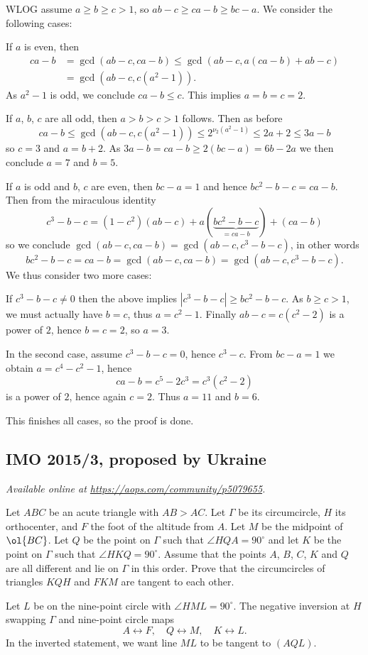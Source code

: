 \documentclass[11pt]{scrartcl}
\begin{document}
WLOG assume $a \ge b \ge c > 1$, so $ab-c \ge ca-b \ge bc-a$.
We consider the following cases:
\begin{itemize}
  \ii If $a$ is even, then
  \begin{align*}
    ca-b &= \gcd (ab-c, ca-b) \le \gcd (ab-c, a(ca-b)+ab-c) \\
    &= \gcd\left( ab-c, c(a^2-1) \right).
  \end{align*}
  As $a^2-1$ is odd, we conclude $ca-b \le c$.
  This implies $a=b=c=2$.

  \ii If $a$, $b$, $c$ are all odd, then $a > b > c > 1$ follows.
  Then as before
  \[  ca-b \le \gcd (ab-c, c(a^2-1))
    \le 2^{\nu_2(a^2-1)} \le 2a+2 \le 3a-b \]
  so $c = 3$ and $a = b+2$.
  As $3a-b = ca-b \ge 2(bc-a) = 6b-2a$ we then conclude $a=7$ and $b=5$.

  \ii If $a$ is odd and $b$, $c$ are even, then $bc-a=1$
  and hence $bc^2 - b - c = ca - b$.
  Then from the miraculous identity
  \[ c^3-b-c = (1-c^2)(ab-c) + a(\underbrace{bc^2-b-c}_{=ca-b}) + (ca-b) \]
  so we conclude $\gcd(ab-c, ca-b) = \gcd(ab-c, c^3-b-c)$, in other words
  \[ bc^2-b-c = ca-b = \gcd(ab-c, ca-b) = \gcd(ab-c, c^3-b-c). \]
  We thus consider two more cases:
  \begin{itemize}
    \ii If $c^3-b-c \neq 0$ then
    the above implies $|c^3-b-c| \ge bc^2-b-c$.
    As $b \ge c > 1$, we must actually have $b = c$,
    thus $a = c^2-1$.
    Finally $ab-c = c(c^2-2)$ is a power of $2$, hence $b=c=2$, so $a=3$.

    \ii In the second case, assume $c^3-b-c = 0$, hence $c^3-c$.
    From $bc-a=1$ we obtain $a=c^4-c^2-1$,
    hence
    \[ ca-b = c^5-2c^3 = c^3(c^2-2) \]
    is a power of $2$, hence again $c = 2$.
    Thus $a=11$ and $b=6$.
  \end{itemize}
\end{itemize}
This finishes all cases, so the proof is done.
\pagebreak

\subsection{IMO 2015/3, proposed by Ukraine}
\textsl{Available online at \url{https://aops.com/community/p5079655}.}
\begin{mdframed}[style=mdpurplebox,frametitle={Problem statement}]
Let $ABC$ be an acute triangle with $AB > AC$.
Let $\Gamma$ be its circumcircle, $H$ its orthocenter,
and $F$ the foot of the altitude from $A$.
Let $M$ be the midpoint of $\ol{BC}$.
Let $Q$ be the point on $\Gamma$ such that $\angle HQA = 90^{\circ}$
and let $K$ be the point on $\Gamma$ such that $\angle HKQ = 90^{\circ}$.
Assume that the points $A$, $B$, $C$, $K$ and $Q$
are all different and lie on $\Gamma$ in this order.
Prove that the circumcircles of triangles $KQH$ and $FKM$
are tangent to each other.
\end{mdframed}
Let $L$ be on the nine-point circle with $\angle HML = 90^{\circ}$.
The negative inversion at $H$ swapping $\Gamma$
and nine-point circle maps
\[ A \longleftrightarrow F, \quad
  Q \longleftrightarrow M, \quad
  K \longleftrightarrow L.
\]
In the inverted statement, we want line $ML$ to be
tangent to $(AQL)$.
\end{document}
